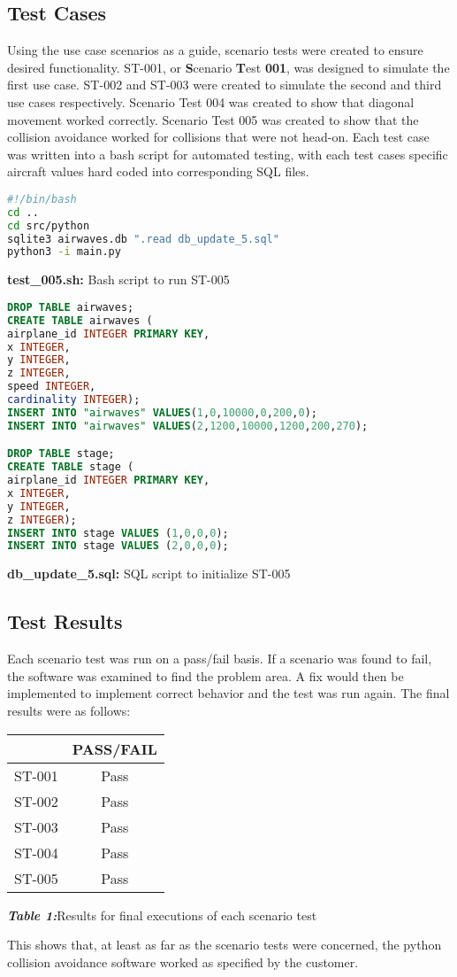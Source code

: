\documentclass[12pt]{report}
\theoremstyle{plain}
\theoremstyle{definition}
\begin{document}
\subsection*{Test Cases}
Using the use case scenarios as a guide, scenario tests were created to ensure desired functionality.  ST-001, or \textbf{S}cenario \textbf{T}est \textbf{001}, was designed to simulate the first use case.  ST-002 and ST-003 were created to simulate the second and third use cases respectively.  Scenario Test 004 was created to show that diagonal movement worked correctly.  Scenario Test 005 was created to show that the collision avoidance worked for collisions that were not head-on. Each test case was written into a bash script for automated testing, with each test cases specific aircraft values hard coded into corresponding SQL files.
\begin{lstlisting}[language =Bash]
#!/bin/bash
cd ..
cd src/python
sqlite3 airwaves.db ".read db_update_5.sql"
python3 -i main.py
\end{lstlisting}
\begin{center}
\footnotesize{\textbf{test\_005.sh:} Bash script to run ST-005}
\end{center}
\begin{lstlisting}[language =SQL]
DROP TABLE airwaves;
CREATE TABLE airwaves (
airplane_id INTEGER PRIMARY KEY,
x INTEGER,
y INTEGER,
z INTEGER,
speed INTEGER,
cardinality INTEGER);
INSERT INTO "airwaves" VALUES(1,0,10000,0,200,0);
INSERT INTO "airwaves" VALUES(2,1200,10000,1200,200,270);

DROP TABLE stage;
CREATE TABLE stage (
airplane_id INTEGER PRIMARY KEY,
x INTEGER,
y INTEGER,
z INTEGER);
INSERT INTO stage VALUES (1,0,0,0);
INSERT INTO stage VALUES (2,0,0,0);
\end{lstlisting}
\begin{center}
\footnotesize{\textbf{db\_update\_5.sql:} SQL script to initialize ST-005}
\end{center}
\subsection*{Test Results}
Each scenario test was run on a pass/fail basis.  If a scenario was found to fail, the software was examined to find the problem area.  A fix would then be implemented to implement correct behavior and the test was run again.  The final results were as follows:
\begin{center}
 \begin{tabular}{||c c||} 
 \hline
  & PASS/FAIL \\ [0.5ex] 
 \hline\hline
 ST-001 & Pass \\ 
 \hline
 ST-002 & Pass  \\
 \hline
 ST-003 & Pass \\
 \hline
 ST-004 & Pass \\
 \hline
 ST-005 & Pass  \\[1ex]
 \hline
\end{tabular}
\centerline{\textit{\textbf{Table 1:}}Results for final executions of each scenario test}
\end{center}
This shows that, at least as far as the scenario tests were concerned, the python collision avoidance software worked as specified by the customer.
\end{document}

